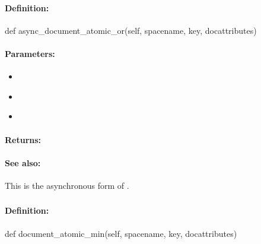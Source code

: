 \paragraph{Definition:}
\begin{pythoncode}
def async_document_atomic_or(self, spacename, key, docattributes)
\end{pythoncode}

\paragraph{Parameters:}
\begin{itemize}[noitemsep]
\item {}\\

\item {}\\

\item {}\\

\end{itemize}

\paragraph{Returns:}


\paragraph{See also:}  This is the asynchronous form of .

\pagebreak
\subsubsection{}
\label{api:python:document_atomic_min}


\paragraph{Definition:}
\begin{pythoncode}
def document_atomic_min(self, spacename, key, docattributes)
\end{pythoncode}

